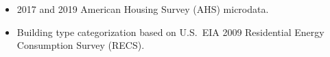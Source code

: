 \begin{itemize}
\item 2017 and 2019 American Housing Survey (AHS) microdata.
\item Building type categorization based on U.S.~EIA 2009 Residential Energy Consumption Survey (RECS).
\end{itemize}
